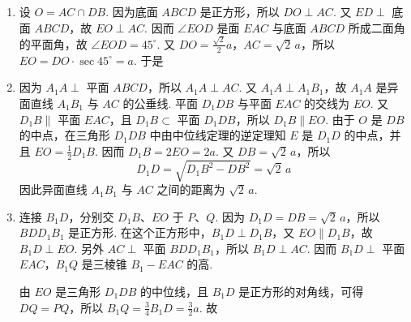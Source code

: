 \begin{solution}
\begin{enumerate}
\item 设 \(O=AC\cap DB\). 因为底面 \(ABCD\) 是正方形，所以 \(DO\perp AC\). 又 \(ED\perp\) 底面 \(ABCD\)，故 \(EO\perp AC\). 因而 \(\angle EOD\) 是面 \(EAC\) 与底面 \(ABCD\) 所成二面角的平面角，故 \(\angle EOD=45^\circ\).
又 \(DO=\frac{\sqrt2}{2}a\)，\(AC=\sqrt2\,a\)，所以 \(EO=DO\cdot\sec45^\circ=a\). 于是

\item 因为 \(A_1A\perp\) 平面 \(ABCD\)，所以 \(A_1A\perp AC\). 又 \(A_1A\perp A_1B_1\)，故 \(A_1A\) 是异面直线 \(A_1B_1\) 与 \(AC\) 的公垂线.
平面 \(D_1DB\) 与平面 \(EAC\) 的交线为 \(EO\). 又 \(D_1B\parallel\) 平面 \(EAC\)，且 \(D_1B\subset\) 平面 \(D_1DB\)，所以 \(D_1B\parallel EO\). 由于 \(O\) 是 \(DB\) 的中点，在三角形 \(D_1DB\) 中由中位线定理的逆定理知 \(E\) 是 \(D_1D\) 的中点，并且 \(EO=\frac12D_1B\). 因而 \(D_1B=2EO=2a\). 又 \(DB=\sqrt2\,a\)，所以
\[
D_1D=\sqrt{D_1B^2-DB^2}=\sqrt2\,a
\]
因此异面直线 \(A_1B_1\) 与 \(AC\) 之间的距离为 \(\sqrt2\,a\).

\item 连接 \(B_1D\)，分别交 \(D_1B\)、\(EO\) 于 \(P\)、\(Q\). 因为 \(D_1D=DB=\sqrt2\,a\)，所以 \(BDD_1B_1\) 是正方形. 在这个正方形中，\(B_1D\perp D_1B\)，又 \(EO\parallel D_1B\)，故 \(B_1D\perp EO\). 另外 \(AC\perp\) 平面 \(BDD_1B_1\)，所以 \(B_1D\perp AC\). 因而 \(B_1D\perp\) 平面 \(EAC\)，\(B_1Q\) 是三棱锥 \(B_1-EAC\) 的高.

由 \(EO\) 是三角形 \(D_1DB\) 的中位线，且 \(B_1D\) 是正方形的对角线，可得 \(DQ=PQ\)，所以 \(B_1Q=\frac34 B_1D=\frac32 a\). 故
\end{enumerate}
\end{solution}

